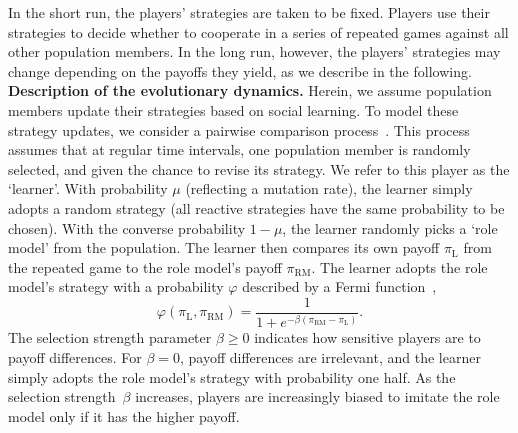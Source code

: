 \documentclass[11pt]{article}
\def\rolemodel{\text{RM}}
\def\learner{\text{L}}
\theoremstyle{plainCl1}
\theoremstyle{plainCl2}
\begin{document}
In the short run, the players' strategies are taken to be fixed.
Players use their strategies to decide whether to cooperate in a series of repeated games against all other population members. 
In the long run, however, the players' strategies may change depending on the payoffs they yield, as we describe in the following.\\
 

\noindent
{\bf Description of the evolutionary dynamics.}
Herein, we assume population members update their strategies based on social learning. 
To model these strategy updates, we consider a pairwise comparison process~\citep{traulsen2007pairwise}. 
This process assumes that at regular time intervals, one population member is randomly selected, and given the chance to revise its strategy.
We refer to this player as the `learner'. 
With probability $\mu$ (reflecting a mutation rate), the learner simply adopts a random strategy (all reactive strategies have the same probability to be chosen). 
With the converse probability $1\!-\!\mu$, the learner randomly picks a `role model' from the population. 
The learner then compares its own payoff $\pi_\learner$ from the repeated game to the role model's payoff $\pi_\rolemodel$. 
The learner adopts the role model's strategy with a probability \(\varphi\) described by a Fermi function~\citep{blume:GEB:1995,szabo:PRE:1998}, 
\begin{equation} \label{Eq:rho}
    \varphi\left(\pi_\learner, \pi_\rolemodel\right) = \frac{1}{1\!+\! e^{- \!\beta\left(\pi_\rolemodel- \pi_\learner\right)}}.
\end{equation}
The selection strength parameter $\beta\!\ge\!0$ indicates how sensitive players are to payoff differences. 
For $\beta\!=\!0$, payoff differences are irrelevant, and the learner simply adopts the role model's strategy with probability one half. As the selection strength~$\beta$ increases, players are increasingly biased to imitate the role model only if it has the higher payoff. 

\end{document}
